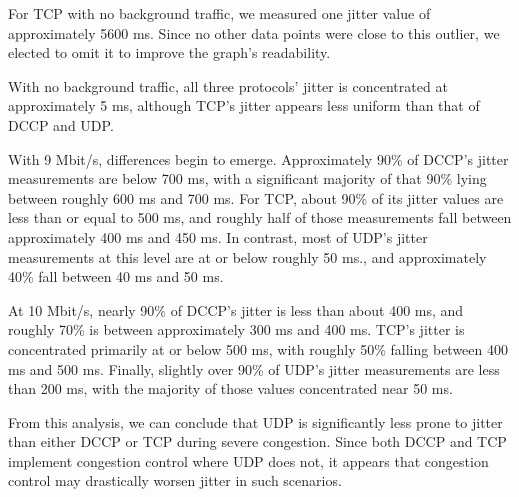 For TCP with no background traffic, we measured one jitter value of
approximately 5600 ms. Since no other data points were close to this outlier, we
elected to omit it to improve the graph's readability.

With no background traffic, all three protocols' jitter is concentrated at
approximately 5 ms, although TCP's jitter appears less uniform than that of DCCP
and UDP.

With 9 Mbit/s, differences begin to emerge. Approximately 90\% of DCCP's jitter
measurements are below 700 ms, with a significant majority of that 90\% lying
between roughly 600 ms and 700 ms. For TCP, about 90\% of its jitter values are
less than or equal to 500 ms, and roughly half of those measurements fall
between approximately 400 ms and 450 ms. In contrast, most of UDP's jitter
measurements at this level are at or below roughly 50 ms., and approximately
40\% fall between 40 ms and 50 ms.

At 10 Mbit/s, nearly 90\% of DCCP's jitter is less than about 400 ms, and
roughly 70\% is between approximately 300 ms and 400 ms. TCP's jitter is
concentrated primarily at or below 500 ms, with roughly 50\% falling between 400
ms and 500 ms. Finally, slightly over 90\% of UDP's jitter measurements are less
than 200 ms, with the majority of those values concentrated near 50 ms.

From this analysis, we can conclude that UDP is significantly less prone to
jitter than either DCCP or TCP during severe congestion. Since both DCCP and TCP
implement congestion control where UDP does not, it appears that congestion
control may drastically worsen jitter in such scenarios.

